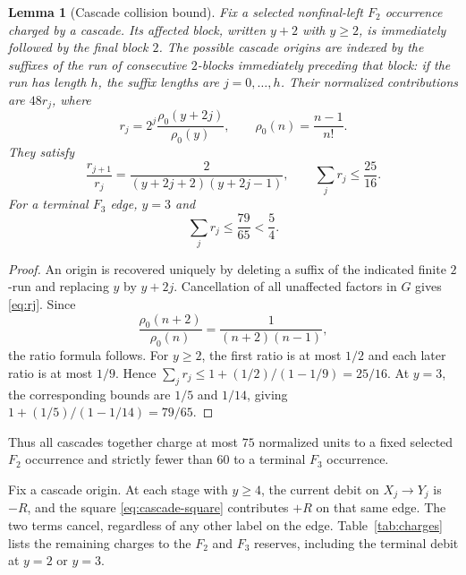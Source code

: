 \documentclass[11pt]{amsart}
\newtheorem{lemma}[theorem]{Lemma}
\theoremstyle{definition}
\theoremstyle{remark}
\begin{document}
\begin{lemma}[Cascade collision bound]
\label{lem:collision}
Fix a selected nonfinal-left $F_2$ occurrence charged by a cascade.  Its
affected block, written $y+2$ with $y\ge2$, is immediately followed by the
final block $2$.  The possible cascade origins are indexed by the suffixes of
the run of consecutive $2$-blocks immediately preceding that block: if the
run has length $h$, the suffix lengths are $j=0,\ldots,h$.  Their normalized
contributions are $48r_j$, where
\begin{equation}
 r_j=2^j\frac{\rho_0(y+2j)}{\rho_0(y)},\qquad
 \rho_0(n)=\frac{n-1}{n!}.
 \label{eq:rj}
\end{equation}
They satisfy
\begin{equation}
 \frac{r_{j+1}}{r_j}
 =\frac{2}{(y+2j+2)(y+2j-1)},
 \qquad
 \sum_j r_j\le\frac{25}{16}.
 \label{eq:rj-bound}
\end{equation}
For a terminal $F_3$ edge, $y=3$ and
\begin{equation}
 \sum_j r_j\le\frac{79}{65}<\frac54.
 \label{eq:rj-F3}
\end{equation}
\end{lemma}

\begin{proof}
An origin is recovered uniquely by deleting a suffix of the indicated
finite $2$-run and replacing $y$ by $y+2j$.  Cancellation of all
unaffected factors in $G$ gives \eqref{eq:rj}.  Since
\[
 \frac{\rho_0(n+2)}{\rho_0(n)}
 =\frac1{(n+2)(n-1)},
\]
the ratio formula follows.  For $y\ge2$, the first ratio is at most
$1/2$ and each later ratio is at most $1/9$.  Hence
$\sum_j r_j\le1+(1/2)/(1-1/9)=25/16$.  At $y=3$, the corresponding
bounds are $1/5$ and $1/14$, giving
$1+(1/5)/(1-1/14)=79/65$.
\end{proof}

Thus all cascades together charge at most $75$ normalized units to a fixed
selected $F_2$ occurrence and strictly fewer than $60$ to a terminal $F_3$
occurrence.

Fix a cascade origin. At each stage with $y\ge4$, the current debit
on $X_j\to Y_j$ is $-R$, and the square \eqref{eq:cascade-square}
contributes $+R$ on that same edge. The two terms cancel, regardless
of any other label on the edge. Table~\ref{tab:charges} lists the
remaining charges to the $F_2$ and $F_3$ reserves, including the
terminal debit at $y=2$ or $y=3$.
\end{document}
